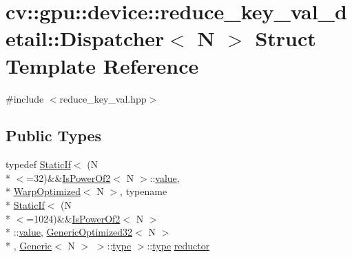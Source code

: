 \hypertarget{structcv_1_1gpu_1_1device_1_1reduce__key__val__detail_1_1Dispatcher}{\section{cv\-:\-:gpu\-:\-:device\-:\-:reduce\-\_\-key\-\_\-val\-\_\-detail\-:\-:Dispatcher$<$ N $>$ Struct Template Reference}
\label{structcv_1_1gpu_1_1device_1_1reduce__key__val__detail_1_1Dispatcher}
}


{\ttfamily \#include $<$reduce\-\_\-key\-\_\-val.\-hpp$>$}

\subsection*{Public Types}
\begin{DoxyCompactItemize}
\item 
typedef \hyperlink{structcv_1_1gpu_1_1device_1_1reduce__key__val__detail_1_1StaticIf}{Static\-If}$<$ (N\\*
$<$=32)\&\&\hyperlink{structcv_1_1gpu_1_1device_1_1reduce__key__val__detail_1_1IsPowerOf2}{Is\-Power\-Of2}$<$ N $>$\-::\hyperlink{highgui__c_8h_ad4670c92695d4327c21292905a803901}{value}, \\*
\hyperlink{structcv_1_1gpu_1_1device_1_1reduce__key__val__detail_1_1WarpOptimized}{Warp\-Optimized}$<$ N $>$, typename \\*
\hyperlink{structcv_1_1gpu_1_1device_1_1reduce__key__val__detail_1_1StaticIf}{Static\-If}$<$ (N\\*
$<$=1024)\&\&\hyperlink{structcv_1_1gpu_1_1device_1_1reduce__key__val__detail_1_1IsPowerOf2}{Is\-Power\-Of2}$<$ N $>$\\*
\-::\hyperlink{highgui__c_8h_ad4670c92695d4327c21292905a803901}{value}, \hyperlink{structcv_1_1gpu_1_1device_1_1reduce__key__val__detail_1_1GenericOptimized32}{Generic\-Optimized32}$<$ N $>$\\*
, \hyperlink{structcv_1_1gpu_1_1device_1_1reduce__key__val__detail_1_1Generic}{Generic}$<$ N $>$ $>$\-::\hyperlink{imgproc__c_8h_a84612d8738bf935200cf32a103d8efe1}{type} $>$\-::\hyperlink{imgproc__c_8h_a84612d8738bf935200cf32a103d8efe1}{type} \hyperlink{structcv_1_1gpu_1_1device_1_1reduce__key__val__detail_1_1Dispatcher_abcfb41fcc1fbf4d0cc6d633b53d331f1}{reductor}
\end{DoxyCompactItemize}


